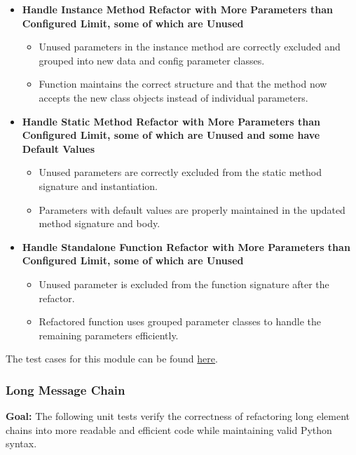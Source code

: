 \documentclass[12pt, titlepage]{article}
\begin{document}
\begin{enumerate}[label={\bf \textcolor{Maroon}{test-SRT-\arabic*}}, wide=0pt, font=\itshape]
\begin{itemize}
    \item \textbf{Handle Instance Method Refactor with More Parameters than Configured Limit, some of which are Unused}
    \begin{itemize}
        \item Unused parameters in the instance method are correctly excluded and grouped into new data and config parameter classes.
        \item Function maintains the correct structure and that the method now accepts the new class objects instead of individual parameters.
    \end{itemize}

    \item \textbf{Handle Static Method Refactor with More Parameters than Configured Limit, some of which are Unused and some have Default Values}
    \begin{itemize}
        \item Unused parameters are correctly excluded from the static method signature and instantiation.
        \item Parameters with default values are properly maintained in the updated method signature and body.
    \end{itemize}

    \item \textbf{Handle Standalone Function Refactor with More Parameters than Configured Limit, some of which are Unused}
    \begin{itemize}
        \item Unused parameter is excluded from the function signature after the refactor.
        \item Refactored function uses grouped parameter classes to handle the remaining parameters efficiently.
    \end{itemize}
\end{itemize}

\noindent The test cases for this module can be found \href{https://github.com/ssm-lab/capstone--source-code-optimizer/blob/new-poc/tests/refactorers/test_long_parameter_list_refactor.py
}{here}.

\subsubsection{Long Message Chain}

\textbf{Goal:} The following unit tests verify the correctness of refactoring long element chains into more readable and efficient code while maintaining valid Python syntax.\\


\end{enumerate}
\end{document}
